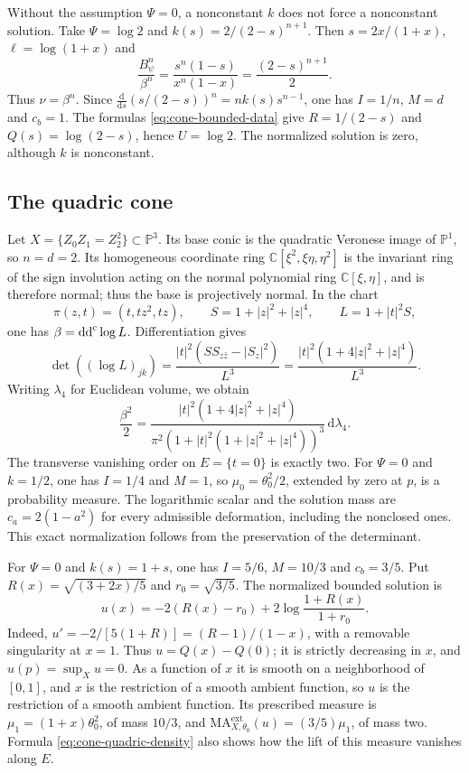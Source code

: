 \begin{example}\label{ex:cone-angular-radial-cancellation}
Without the assumption $\Psi=0$, a nonconstant $k$ does not force a nonconstant solution. Take $\Psi=\log2$ and $k(s)=2/(2-s)^{n+1}$. Then $s=2x/(1+x)$, $\ell=\log(1+x)$ and
\[
\frac{B_\psi^n}{\beta^n}=\frac{s^n(1-s)}{x^n(1-x)}=\frac{(2-s)^{n+1}}2.
\]
Thus $\nu=\beta^n$. Since $\frac{\mathrm{d}}{\mathrm{d} s}(s/(2-s))^n=nk(s)s^{n-1}$, one has $I=1/n$, $M=d$ and $c_b=1$. The formulas \eqref{eq:cone-bounded-data} give $R=1/(2-s)$ and $Q(s)=\log(2-s)$, hence $U=\log2$. The normalized solution is zero, although $k$ is nonconstant.
\end{example}

\subsection{The quadric cone}\label{sec:quadric-cone-equations}

Let $X=\{Z_0Z_1=Z_2^2\}\subset\mathbb P^3$. Its base conic is the quadratic Veronese image of $\mathbb P^1$, so $n=d=2$. Its homogeneous coordinate ring $\mathbb C[\xi^2,\xi\eta,\eta^2]$ is the invariant ring of the sign involution acting on the normal polynomial ring $\mathbb C[\xi,\eta]$, and is therefore normal; thus the base is projectively normal. In the chart
\[
\pi(z,t)=(t,tz^2,tz),\qquad S=1+|z|^2+|z|^4,\qquad L=1+|t|^2S,
\]
one has $\beta=\mathrm{dd}^{\mathrm{c}}\log L$. Differentiation gives
\[
\det((\log L)_{j\bar k})=\frac{|t|^2(SS_{z\bar z}-|S_z|^2)}{L^3}=\frac{|t|^2(1+4|z|^2+|z|^4)}{L^3}.
\]
Writing $\lambda_4$ for Euclidean volume, we obtain
\begin{equation}\label{eq:cone-quadric-density}
\frac{\beta^2}{2}=\frac{|t|^2(1+4|z|^2+|z|^4)}{\pi^2(1+|t|^2(1+|z|^2+|z|^4))^3}\,\mathrm{d}\lambda_4.
\end{equation}
The transverse vanishing order on $E=\{t=0\}$ is exactly two. For $\Psi=0$ and $k=1/2$, one has $I=1/4$ and $M=1$, so $\mu_0=\theta_0^2/2$, extended by zero at $p$, is a probability measure. The logarithmic scalar and the solution mass are $c_a=2(1-a^2)$ for every admissible deformation, including the nonclosed ones. This exact normalization follows from the preservation of the determinant.

For $\Psi=0$ and $k(s)=1+s$, one has $I=5/6$, $M=10/3$ and $c_b=3/5$. Put $R(x)=\sqrt{(3+2x)/5}$ and $r_0=\sqrt{3/5}$. The normalized bounded solution is
\begin{equation}\label{eq:cone-quadric-bounded-solution}
u(x)=-2(R(x)-r_0)+2\log\frac{1+R(x)}{1+r_0}.
\end{equation}
Indeed, $u'=-2/[5(1+R)]=(R-1)/(1-x)$, with a removable singularity at $x=1$. Thus $u=Q(x)-Q(0)$; it is strictly decreasing in $x$, and $u(p)=\sup_Xu=0$. As a function of $x$ it is smooth on a neighborhood of $[0,1]$, and $x$ is the restriction of a smooth ambient function, so $u$ is the restriction of a smooth ambient function. Its prescribed measure is $\mu_1=(1+x)\theta_0^2$, of mass $10/3$, and $\mathrm{MA}^{\mathrm{ext}}_{X,\theta_0}(u)=(3/5)\mu_1$, of mass two. Formula \eqref{eq:cone-quadric-density} also shows how the lift of this measure vanishes along $E$.

